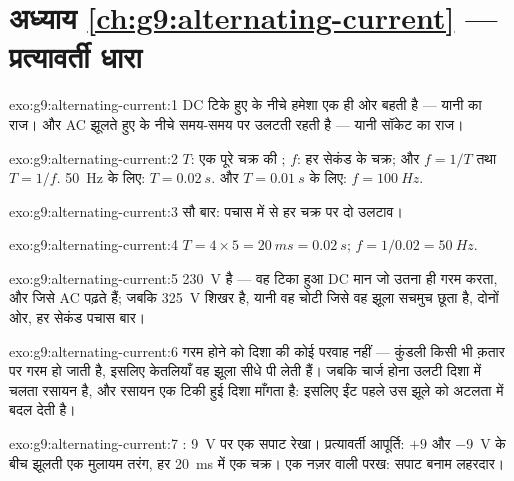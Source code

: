 \section*{अध्याय \ref{ch:g9:alternating-current} --- प्रत्यावर्ती धारा}

\begin{solution}{exo:g9:alternating-current:1}
DC टिके हुए  के नीचे हमेशा एक ही ओर बहती है --- यानी  का
राज। और AC झूलते हुए  के नीचे समय-समय पर उलटती रहती है ---
यानी सॉकेट का राज।
\end{solution}

\begin{solution}{exo:g9:alternating-current:2}
$T$: एक पूरे चक्र की ; $f$: हर सेकंड के चक्र; और $f = 1/T$ तथा
$T = 1/f$. \qty{50}{Hz} के लिए: $T = \qty{0.02}{s}$. और
$T = \qty{0.01}{s}$ के लिए: $f = \qty{100}{Hz}$.
\end{solution}

\begin{solution}{exo:g9:alternating-current:3}
सौ बार: पचास में से हर चक्र पर दो उलटाव।
\end{solution}

\begin{solution}{exo:g9:alternating-current:4}
$T = 4 \times 5 = \qty{20}{ms} = \qty{0.02}{s}$; $f = 1/0.02 =
\qty{50}{Hz}$.
\end{solution}

\begin{solution}{exo:g9:alternating-current:5}
\qty{230}{V}  है --- वह टिका हुआ DC मान जो उतना
ही गरम करता, और जिसे AC  पढ़ते हैं; जबकि \qty{325}{V} शिखर है,
यानी वह चोटी जिसे वह झूला सचमुच छूता है, दोनों ओर, हर सेकंड पचास बार।
\end{solution}

\begin{solution}{exo:g9:alternating-current:6}
गरम होने को दिशा की कोई परवाह नहीं --- कुंडली किसी भी क़तार पर गरम हो
जाती है, इसलिए केतलियाँ वह झूला सीधे पी लेती हैं। जबकि चार्ज होना उलटी
दिशा में चलता रसायन है, और रसायन एक टिकी हुई दिशा माँगता है: इसलिए ईंट
पहले उस झूले को अटलता में बदल देती है।
\end{solution}

\begin{solution}{exo:g9:alternating-current:7}
: \qty{9}{V} पर एक सपाट रेखा। प्रत्यावर्ती आपूर्ति: $+9$ और
\qty{-9}{V} के बीच झूलती एक मुलायम तरंग, हर \qty{20}{ms} में एक चक्र।
एक नज़र वाली परख: सपाट बनाम लहरदार।
\end{solution}

